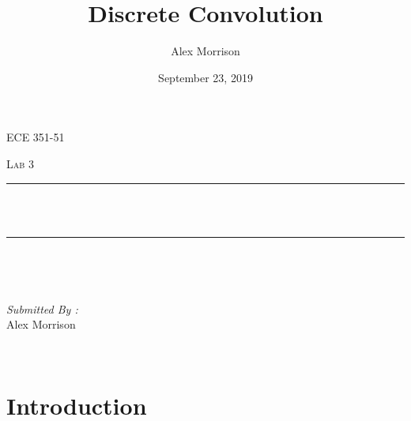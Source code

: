 \documentclass[12pt]{report}
\title{Discrete Convolution}
\author{ Alex Morrison}
\date{September 23, 2019}
\makeatletter
\let\thetitle\@title
\makeatother
\begin{document}

\begin{titlepage}
	\centering
    \vspace*{0.5 cm}
\begin{center}    \textsc{\Large ECE 351-51}\\[2.0 cm]	\end{center}%
	\textsc{\Large  Lab 3}\\[0.5 cm]				%
	\rule{\linewidth}{0.2 mm} \\[0.4 cm]
	{ \huge \bfseries \thetitle}\\
	\rule{\linewidth}{0.2 mm} \\[1.5 cm]
	
	\begin{minipage}{0.4\textwidth}
		\begin{flushleft} \large
			\end{flushleft}
			\end{minipage}~
			\begin{minipage}{0.4\textwidth}
            
			\begin{flushright} \large
			\emph{Submitted By :} \\
			Alex Morrison  
		\end{flushright}
           
	\end{minipage}\\[2 cm]
	

    
    
    
    
	
\end{titlepage}


\tableofcontents
\pagebreak

\renewcommand{\thesection}{\arabic{section}}
\section{Introduction}
\end{document}
